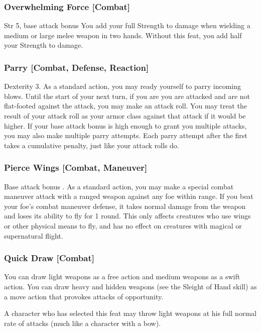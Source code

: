 \subsubsection{Overwhelming Force [Combat]}
 Str 5, base attack bonus 
 You add your full Strength to damage when wielding a medium or large melee weapon in two hands.
 Without this feat, you add half your Strength to damage.

\subsubsection{Parry [Combat, Defense, Reaction]}
\featpre Dexterity 3.
\featben As a standard action, you may ready yourself to parry incoming blows. Until the start of your next turn, if you are you are attacked and are not flat-footed against the attack, you may make an attack roll. You may treat the result of your attack roll as your armor class against that attack if it would be higher. If your base attack bonus is high enough to grant you multiple attacks, you may also make multiple parry attempts. Each parry attempt after the first takes a cumulative  penalty, just like your attack rolls do.

\subsubsection{Pierce Wings [Combat, Maneuver]}
\featpre Base attack bonus .
\featben As a standard action, you may make a special combat maneuver attack with a ranged weapon against any foe within range. If you beat your foe's combat maneuver defense, it takes normal damage from the weapon and loses its ability to fly for 1 round. This only affects creatures who use wings or other physical means to fly, and has no effect on creatures with magical or supernatural flight.

\subsubsection{Quick Draw [Combat]}
 You can draw light weapons as a free action and medium weapons as a swift action. You can draw heavy and hidden weapons (see the Sleight of Hand skill) as a move action that provokes attacks of opportunity.
\par A character who has selected this feat may throw light weapons at his full normal rate of attacks (much like a character with a bow).

